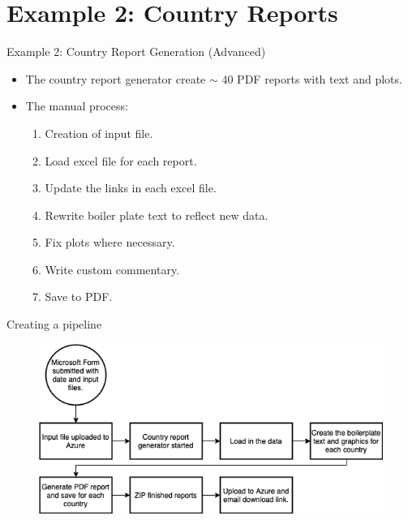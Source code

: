 \documentclass[aspectratio=169]{beamer}
\begin{document}
\section{Example 2: Country Reports}

\begin{frame}{Example 2: Country Report Generation (Advanced)}

\begin{itemize}
	\item The country report generator create $\sim$ 40 PDF reports with text and plots. 
	\item The manual process:
	\begin{enumerate}
		\item Creation of input file.
		\item Load excel file for each report.
		\item Update the links in each excel file.
		\item Rewrite boiler plate text to reflect new data.
		\item Fix plots where necessary.
		\item Write custom commentary.
		\item Save to PDF.
	\end{enumerate}
\end{itemize}

\end{frame}

\begin{frame}{Creating a pipeline}
\begin{figure}
\centering
\includegraphics[width=0.7\linewidth]{graphics/CountryReportGenerator.drawio.png}	
\end{figure}

\end{frame}
\end{document}
